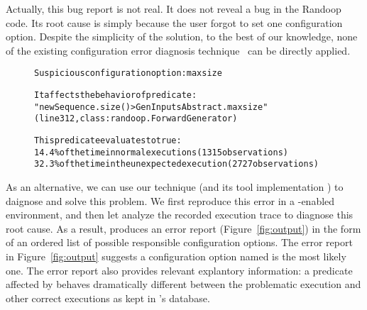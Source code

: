 Actually, this bug report is not real. It does not reveal a bug
in the Randoop code. Its root cause is simply because
the user forgot to set one configuration option.
Despite the simplicity of the solution, to the best of our knowledge, none of the
existing configuration error diagnosis technique~\cite{Attariyan:2008:UCD, 
Yuan:2011:COC, Su:2009:AGP, Whitaker:2004:CDS, Wang:2004:AMT,
Attariyan:2010:ACT, Rabkin:2011:PPC} can be directly applied.




\begin{figure}[t]
\begin{CodeOut}
\begin{alltt} 
Suspicious configuration option: maxsize

It affects the behavior of predicate:
"newSequence.size() > GenInputsAbstract.maxsize"
(line 312, class: randoop.ForwardGenerator) 

This predicate evaluates to true:
  14.4\% of the time in normal executions (1315 observations)
  32.3\% of the time in the unexpected execution (2727 observations)

\end{alltt}
\end{CodeOut}
\vspace*{-15pt}
\end{figure}

As an alternative, we can use our technique (and its tool implementation \ourtool)
to daignose and solve this problem. We first reproduce this
error in a \ourtool-enabled environment, and then let \ourtool analyze the
recorded execution trace to diagnose this root cause.
As a result, \ourtool produces
an error report (Figure~\ref{fig:output}) in the form of an ordered list of possible responsible
configuration options.
The error report in Figure~\ref{fig:output} suggests
a configuration option named
 is the most likely one.
The error report also provides relevant explantory
information: %
a predicate affected by  behaves dramatically
different between the problematic execution and other correct executions 
as kept in \ourtool's database.


